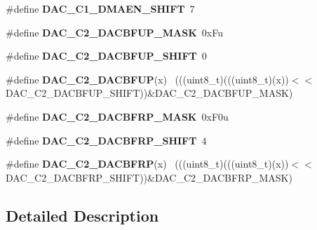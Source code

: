 \begin{DoxyCompactItemize}
\item 
\hypertarget{group___d_a_c___register___masks_ga481f558223c5c36402bebe924bdd00a3}{}\#define {\bfseries D\+A\+C\+\_\+\+C1\+\_\+\+D\+M\+A\+E\+N\+\_\+\+S\+H\+I\+F\+T}~7\label{group___d_a_c___register___masks_ga481f558223c5c36402bebe924bdd00a3}

\item 
\hypertarget{group___d_a_c___register___masks_ga329015367026aaee34f54edcbaab61bb}{}\#define {\bfseries D\+A\+C\+\_\+\+C2\+\_\+\+D\+A\+C\+B\+F\+U\+P\+\_\+\+M\+A\+S\+K}~0x\+Fu\label{group___d_a_c___register___masks_ga329015367026aaee34f54edcbaab61bb}

\item 
\hypertarget{group___d_a_c___register___masks_ga5d43a79719748e490a572fa6cdc75efe}{}\#define {\bfseries D\+A\+C\+\_\+\+C2\+\_\+\+D\+A\+C\+B\+F\+U\+P\+\_\+\+S\+H\+I\+F\+T}~0\label{group___d_a_c___register___masks_ga5d43a79719748e490a572fa6cdc75efe}

\item 
\hypertarget{group___d_a_c___register___masks_gad53572a2ce126813380890d433a76dfb}{}\#define {\bfseries D\+A\+C\+\_\+\+C2\+\_\+\+D\+A\+C\+B\+F\+U\+P}(x)                                            ~(((uint8\+\_\+t)(((uint8\+\_\+t)(x))$<$$<$D\+A\+C\+\_\+\+C2\+\_\+\+D\+A\+C\+B\+F\+U\+P\+\_\+\+S\+H\+I\+F\+T))\&D\+A\+C\+\_\+\+C2\+\_\+\+D\+A\+C\+B\+F\+U\+P\+\_\+\+M\+A\+S\+K)\label{group___d_a_c___register___masks_gad53572a2ce126813380890d433a76dfb}

\item 
\hypertarget{group___d_a_c___register___masks_ga64b53e5effabf2e736fca6088752e6ea}{}\#define {\bfseries D\+A\+C\+\_\+\+C2\+\_\+\+D\+A\+C\+B\+F\+R\+P\+\_\+\+M\+A\+S\+K}~0x\+F0u\label{group___d_a_c___register___masks_ga64b53e5effabf2e736fca6088752e6ea}

\item 
\hypertarget{group___d_a_c___register___masks_ga0ab880f693c25ecf491d3b76df611456}{}\#define {\bfseries D\+A\+C\+\_\+\+C2\+\_\+\+D\+A\+C\+B\+F\+R\+P\+\_\+\+S\+H\+I\+F\+T}~4\label{group___d_a_c___register___masks_ga0ab880f693c25ecf491d3b76df611456}

\item 
\hypertarget{group___d_a_c___register___masks_ga754cc2916d174990b54658380eaf0adc}{}\#define {\bfseries D\+A\+C\+\_\+\+C2\+\_\+\+D\+A\+C\+B\+F\+R\+P}(x)                                            ~(((uint8\+\_\+t)(((uint8\+\_\+t)(x))$<$$<$D\+A\+C\+\_\+\+C2\+\_\+\+D\+A\+C\+B\+F\+R\+P\+\_\+\+S\+H\+I\+F\+T))\&D\+A\+C\+\_\+\+C2\+\_\+\+D\+A\+C\+B\+F\+R\+P\+\_\+\+M\+A\+S\+K)\label{group___d_a_c___register___masks_ga754cc2916d174990b54658380eaf0adc}

\end{DoxyCompactItemize}


\subsection{Detailed Description}
